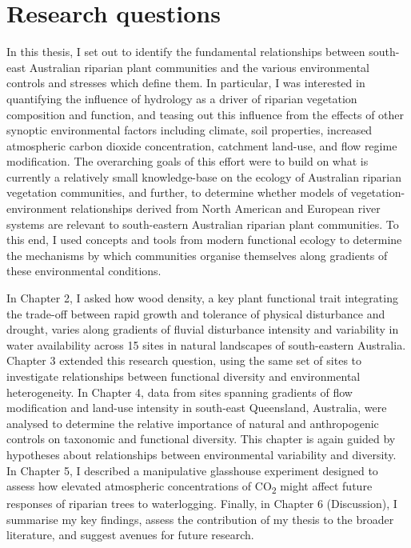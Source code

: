 \section{Research questions}
In this thesis, I set out to identify the fundamental relationships between south-east Australian riparian plant communities and the various environmental controls and stresses which define them. In particular, I was interested in quantifying the influence of hydrology as a driver of riparian vegetation composition and function, and teasing out this influence from the effects of other synoptic environmental factors including climate, soil properties, increased atmospheric carbon dioxide concentration, catchment land-use, and flow regime modification. The overarching goals of this effort were to build on what is currently a relatively small knowledge-base on the ecology of Australian riparian vegetation communities, and further, to determine whether models of vegetation-environment relationships derived from North American and European river systems are relevant to south-eastern Australian riparian plant communities. To this end, I used concepts and tools from modern functional ecology to determine the mechanisms by which communities organise themselves along gradients of these environmental conditions.

In Chapter 2, I asked how wood density, a key plant functional trait integrating the trade-off between rapid growth and tolerance of physical disturbance and drought, varies along gradients of fluvial disturbance intensity and variability in water availability across 15 sites in natural landscapes of south-eastern Australia. Chapter 3 extended this research question, using the same set of sites to investigate relationships between functional diversity and environmental heterogeneity. In Chapter 4, data from sites spanning gradients of flow modification and land-use intensity in south-east Queensland, Australia, were analysed to determine the relative importance of natural and anthropogenic controls on taxonomic and functional diversity. This chapter is again guided by hypotheses about relationships between environmental variability and diversity. In Chapter 5, I described a manipulative glasshouse experiment designed to assess how elevated atmospheric concentrations of CO\textsubscript{2} might affect future responses of riparian trees to waterlogging. Finally, in Chapter 6 (Discussion), I summarise my key findings, assess the contribution of my thesis to the broader literature, and suggest avenues for future research.

\clearpage

\renewcommand\bibname{{References}} 
\begin{small}


\end{small}

